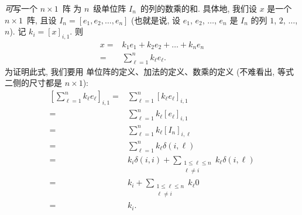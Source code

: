 \emph{可}写一个 \(n \times 1\)~阵%
为 \(n\)~级单位阵 \(I_n\)~的列的数乘的和.
具体地, 我们设 \(x\) 是一个 \(n \times 1\)~阵,
且设 \(I_n = [e_1, e_2, \dots, e_n]\)
(也就是说,
设 \(e_1\), \(e_2\), \(\dots\), \(e_n\) 是
\(I_n\) 的列 \(1\), \(2\), \(\dots\), \(n\)).
记 \(k_i = [x]_{i,1}\).
则
\begin{align*}
    x
    = {} & k_1 e_1 + k_2 e_2 + \dots + k_n e_n
    \\
    = {} & \sum_{\ell = 1}^{n} {k_\ell e_\ell}.
\end{align*}
为证明此式, 我们要用%
单位阵的定义、加法的定义、数乘的定义
(不难看出, 等式二侧的尺寸都是 \(n \times 1\)):
\begin{align*}
    \left[ \sum_{\ell = 1}^{n} {k_\ell e_\ell} \right]_{i,1}
    = {} &
    \sum_{\ell = 1}^{n} {[k_\ell e_\ell]_{i,1}}
    \\
    = {} &
    \sum_{\ell = 1}^{n} {k_\ell [e_\ell]_{i,1}}
    \\
    = {} &
    \sum_{\ell = 1}^{n} {k_\ell [I_n]_{i,\ell}}
    \\
    = {} &
    \sum_{\ell = 1}^{n} {k_\ell \delta(i, \ell)}
    \\
    = {} &
    k_i \delta(i, i)
    + \sum_{\substack{1 \leq \ell \leq n \\ \ell \neq i}}
    {k_\ell \delta(i, \ell)}
    \\
    = {} &
    k_i
    + \sum_{\substack{1 \leq \ell \leq n \\ \ell \neq i}}
    {k_\ell 0}
    \\
    = {} &
    k_i.
\end{align*}

